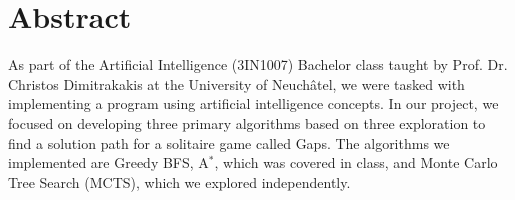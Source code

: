 \chapter{Abstract}
As part of the Artificial Intelligence (3IN1007) Bachelor class taught by Prof. Dr. Christos Dimitrakakis at the University of Neuchâtel, we were tasked with implementing a program using artificial intelligence concepts. In our project, we focused on developing three primary algorithms based on three exploration to find a solution path for a solitaire game called Gaps. The algorithms we implemented are Greedy BFS, A$^*$, which was covered in class, and Monte Carlo Tree Search (MCTS), which we explored independently.
